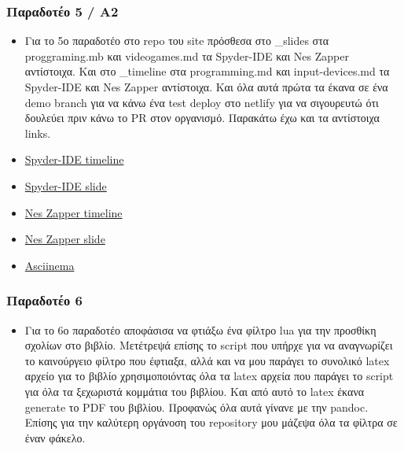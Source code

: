 \hypertarget{ux3c0ux3b1ux3c1ux3b1ux3b4ux3bfux3c4ux3adux3bf-5-ux3b12}{%
\subsubsection{Παραδοτέο 5 /
Α2}\label{ux3c0ux3b1ux3c1ux3b1ux3b4ux3bfux3c4ux3adux3bf-5-ux3b12}}

\begin{itemize}
\tightlist
\item
  Για το 5ο παραδοτέο στο repo του site πρόσθεσα στο \_slides στα
  proggraming.mb και videogames.md τα Spyder-IDE και Nes Zapper
  αντίστοιχα. Και στο \_timeline στα programming.md και input-devices.md
  τα Spyder-IDE και Nes Zapper αντίστοιχα. Και όλα αυτά πρώτα τα έκανα
  σε ένα demo branch για να κάνω ένα test deploy στο netlify για να
  σιγουρευτώ ότι δουλεύει πριν κάνω το PR στον οργανισμό. Παρακάτω έχω
  και τα αντίστοιχα links.
\item
  \href{https://guileless-mandazi-a0b198.netlify.app//timeline/programming/}{Spyder-IDE
  timeline}
\item
  \href{https://guileless-mandazi-a0b198.netlify.app//slides/programming/}{Spyder-IDE
  slide}
\item
  \href{https://guileless-mandazi-a0b198.netlify.app//timeline/input-devices/}{Nes
  Zapper timeline}
\item
  \href{https://guileless-mandazi-a0b198.netlify.app//slides/videogames/}{Nes
  Zapper slide}
\item
  \href{https://asciinema.org/a/wOk4ayYCl3tGLo6lGG4apxYve}{Asciinema}
\end{itemize}

\hypertarget{ux3c0ux3b1ux3c1ux3b1ux3b4ux3bfux3c4ux3adux3bf-6}{%
\subsubsection{Παραδοτέο
6}\label{ux3c0ux3b1ux3c1ux3b1ux3b4ux3bfux3c4ux3adux3bf-6}}

\begin{itemize}
\tightlist
\item
  Για το 6ο παραδοτέο αποφάσισα να φτιάξω ένα φίλτρο lua για την
  προσθίκη σχολίων στο βιβλίο. Μετέτρεψά επίσης το script που υπήρχε για
  να αναγνωρίζει το καινούργειο φίλτρο που έφτιαξα, αλλά και να μου
  παράγει το συνολικό latex αρχείο για το βιβλίο χρησιμοποιόντας όλα τα
  latex αρχεία που παράγει το script για όλα τα ξεχωριστά κομμάτια του
  βιβλίου. Και από αυτό το latex έκανα generate το PDF του βιβλίου.
  Προφανώς όλα αυτά γίνανε με την pandoc. Επίσης για την καλύτερη
  οργάνοση του repository μου μάζεψα όλα τα φίλτρα σε έναν φάκελο.
\end{itemize}

